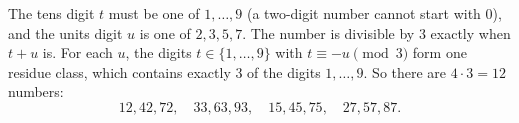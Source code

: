 The tens digit $t$ must be one of $1,\dots,9$ (a two-digit number cannot start with $0$), and the units digit $u$ is one of $2,3,5,7$. The number is divisible by $3$ exactly when $t+u$ is. For each $u$, the digits $t\in\{1,\dots,9\}$ with $t\equiv-u\pmod3$ form one residue class, which contains exactly $3$ of the digits $1,\dots,9$. So there are $4\cdot3=\boxed{12}$ numbers:
\[
12,42,72,\quad 33,63,93,\quad 15,45,75,\quad 27,57,87 .
\]
